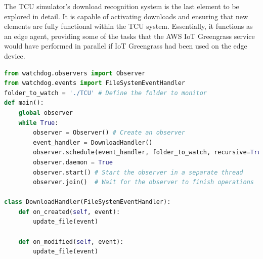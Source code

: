 The TCU simulator's download recognition system is the last element to be explored in detail. It is capable of activating downloads and ensuring that new elements are fully functional within the TCU system. Essentially, it functions as an edge agent, providing some of the tasks that the AWS IoT Greengrass service would have performed in parallel if IoT Greengrass had been used on the edge device.
\begin{lstlisting}[language=Python, caption={Main function of the update recognition system }, label=lst:UpdateRecognition]
from watchdog.observers import Observer
from watchdog.events import FileSystemEventHandler
folder_to_watch = './TCU' # Define the folder to monitor
def main():
    global observer
    while True:
        observer = Observer() # Create an observer
        event_handler = DownloadHandler()
        observer.schedule(event_handler, folder_to_watch, recursive=True) # Attach the event handler to the observer
        observer.daemon = True
        observer.start() # Start the observer in a separate thread
        observer.join()  # Wait for the observer to finish operations

class DownloadHandler(FileSystemEventHandler):
    def on_created(self, event):
        update_file(event)
                        
    def on_modified(self, event):
        update_file(event)
\end{lstlisting}

